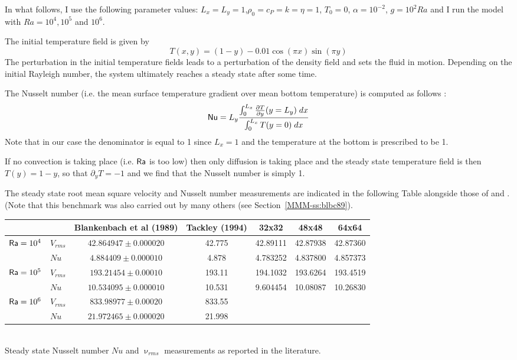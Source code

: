 In what follows, I use the following parameter values:  %
$L_x=L_y=1$,$\rho_0=c_P=k=\eta=1$, $T_0=0$, $\alpha=10^{-2}$, $g=10^{2}Ra$
and I run the model with $Ra=10^4,10^{5}$ and $10^6$.

The initial temperature field is given by 
\begin{equation}
T(x,y)=(1-y) - 0.01\cos(\pi x) \sin(\pi y)
\end{equation}
The perturbation in the initial temperature fields leads to 
a perturbation of the density field and sets the fluid in motion. 
Depending on the initial Rayleigh number, the system ultimately reaches a 
steady state after some time. 

The Nusselt number (i.e. the mean surface temperature gradient over mean bottom temperature)
is computed as follows \cite{blbc89}:
\begin{equation}
{\mathsf{Nu}} = L_y \frac{\int_0^{L_x} \frac{\partial T}{\partial y}(y=L_y) \; dx  }{\int_0^{L_x} T(y=0) \; dx}
\label{eqNu}
\end{equation}
Note that in our case the denominator is equal to 1 since $L_x=1$ and the temperature at the 
bottom is prescribed to be 1.

If no convection is taking place (i.e. ${\mathsf{Ra}}$ is too low) then only diffusion is taking place 
and the steady state temperature field is then $T(y)=1-y$, so that $\partial_y T=-1$ and 
we find that the Nusselt number is simply 1.

The steady state root mean square velocity and Nusselt number measurements
are indicated in the following Table alongside those of \cite{blbc89} and \cite{tack94}.
(Note that this benchmark was also carried out by many others (see Section~\ref{MMM-ss:blbc89}).

\begin{center}
\begin{tabular}{llccccc}
\hline
          &           & Blankenbach et al (1989) & Tackley (1994)  & 32x32 & 48x48 & 64x64  \\
\hline
\hline
${\mathsf{Ra}}=10^4$ & $V_{rms}$ &  $42.864947  \pm 0.000020$ & 42.775 & 42.89111& 42.87938& 42.87360\\  
          & $Nu$      &  $4.884409   \pm 0.000010$ & 4.878  & 4.783252 & 4.837800& 4.857373\\
${\mathsf{Ra}}=10^5$ & $V_{rms}$ &  $193.21454  \pm 0.00010 $ & 193.11 & 194.1032 & 193.6264 &  193.4519  \\ 
          & $Nu$      &  $10.534095  \pm 0.000010$ & 10.531 & 9.604454& 10.08087 &  10.26830  \\
${\mathsf{Ra}}=10^6$ & $V_{rms}$ &  $833.98977  \pm 0.00020 $ & 833.55 & & & \\
          & $Nu$      &  $21.972465  \pm 0.000020$ & 21.998 & & & \\
\hline
\end{tabular}\\
{\small Steady state Nusselt number $Nu$ and $\upnu_{rms}$ measurements as reported in the literature. }
\end{center}

